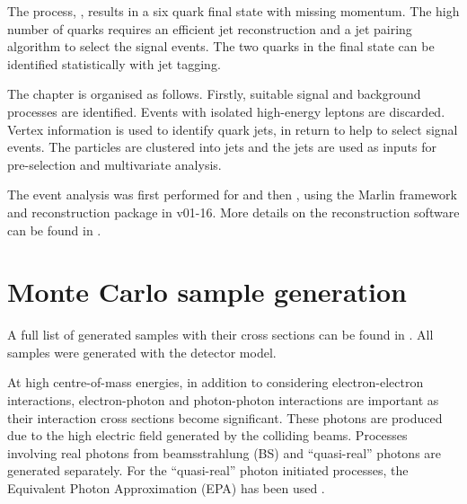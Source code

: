 
The process, \eeToHHbbWWHadFull, results in a six quark final state with missing momentum. The high number of quarks requires an efficient jet reconstruction and a jet pairing algorithm to select the signal events. The two \Pbottom quarks in the final state can be identified statistically with \Pbottom jet tagging. %

The chapter is organised as follows. Firstly, suitable signal and background processes are identified. Events with isolated high-energy leptons are discarded.  Vertex information is used to identify \Pbottom quark jets, in return to help to select signal events. The particles are clustered into jets and the jets are used as inputs for pre-selection and multivariate analysis.

The event analysis was first performed for  and then , using the Marlin framework and reconstruction package in \ilcsoft v01-16. More details on the reconstruction software can be found in .



\section{Monte Carlo sample generation}

A full list of generated samples with their cross sections can be found in . All samples were generated with the \CLICILD detector model.

At high centre-of-mass energies, in addition to considering electron-electron interactions, electron-photon and photon-photon interactions are important as their interaction cross sections become significant. These photons are produced due to the high electric field generated by the colliding beams. Processes involving real photons from beamsstrahlung (BS) and ``quasi-real'' photons are generated separately. For the ``quasi-real'' photon initiated processes, the Equivalent Photon Approximation (EPA) has been used \cite{lyth:jpa00215525}.


